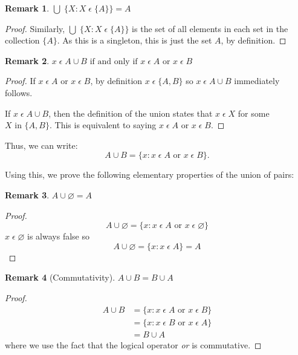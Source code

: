 \documentclass[12pt]{article}
\newtheorem{remark}{Remark}
\begin{document}
\begin{remark}
    $\bigcup\;\{X: X\;\epsilon\;\{A\}\} = A$
\end{remark}
\begin{proof}
    Similarly, $\bigcup\;\{X: X\;\epsilon\;\{A\}\}$ is the set of all elements in each set in the
    collection $\{A\}$. As this is a singleton, this is just the set $A$, by definition.
\end{proof}


\begin{remark}
    $x\;\epsilon\;A \cup B \text{ if and only if } x\;\epsilon\;A \text{ or } x\;\epsilon\;B$
\end{remark}
\begin{proof}
    If $x\;\epsilon\;A \text{ or } x\;\epsilon\;B$, by definition $x\;\epsilon\;\{A, B\}$ so $x\;\epsilon\;A \cup B$
    immediately follows.

    If $x\;\epsilon\;A \cup B$, then the definition of the union states that $x\;\epsilon\;X$ for some
    $X \text{ in } \{A, B\}$. This is equivalent to saying $x\;\epsilon\;A \text{ or } x\;\epsilon\;B$.
\end{proof}

Thus, we can write:
\begin{equation}
    A \cup B = \{x: x\;\epsilon\;A \text{ or } x\;\epsilon\;B\}.
\end{equation}

Using this, we prove the following elementary properties of the union of pairs:
\begin{remark}
    $A \cup\varnothing = A$
\end{remark}
\begin{proof}
    \begin{displaymath}
        A \cup \varnothing = \{x: x\;\epsilon\;A \text{ or } x\;\epsilon\;\varnothing\}
    \end{displaymath}
    $x\;\epsilon\;\varnothing$ is always false so
    \begin{displaymath}
        A \cup \varnothing = \{x: x\;\epsilon\;A\} = A
    \end{displaymath}
\end{proof}

\begin{remark}[Commutativity]
    $A \cup B = B \cup A$
\end{remark}
\begin{proof}
    \begin{align*}
        A \cup B &= \{x: x\;\epsilon\;A \text{ or } x\;\epsilon\;B\}\\
                 &= \{x: x\;\epsilon\;B \text{ or } x\;\epsilon\;A\}\\
                 &= B \cup A
    \end{align*}
    where we use the fact that the logical operator \textit{or} is commutative.
\end{proof}
\end{document}
